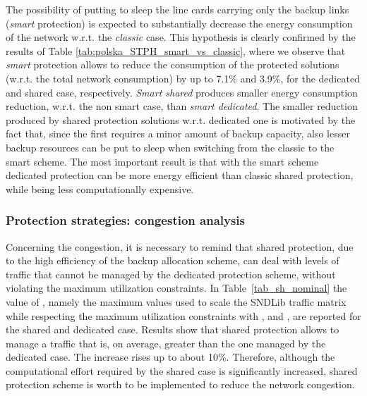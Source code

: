 \documentclass[final,5p,times,twocolumn]{elsarticle}
\begin{document}
The possibility of putting to sleep the line cards carrying only the backup links (\textit{smart} protection) is expected to substantially decrease the energy consumption of the network w.r.t. the \textit{classic} case. This hypothesis is clearly confirmed by the results of Table \ref{tab:polska_STPH_smart_vs_classic}, where we observe that \textit{smart} protection allows to reduce the consumption of the protected solutions (w.r.t. the total network consumption) by up to 7.1\% and 3.9\%, for the dedicated and shared case, respectively. \textit{Smart shared} produces smaller energy consumption reduction, w.r.t. the non smart case, than \textit{smart dedicated}.
The smaller reduction produced by shared protection solutions w.r.t. dedicated one is motivated by the fact that, since the first requires a minor amount of backup capacity, also lesser backup resources can be put to sleep when switching from the classic to the smart scheme. The most important result is that with the smart scheme dedicated protection can be more energy efficient than classic shared protection, while being less computationally expensive. 

\subsubsection{Protection strategies: congestion analysis}
Concerning the congestion, it is necessary to remind that shared protection, due to the high efficiency of the backup allocation scheme, can deal with levels of traffic that cannot be managed by the dedicated protection scheme, without violating  the maximum utilization constraints. In Table~\ref{tab_sh_nominal} the value of , namely the maximum values used to scale the SNDLib traffic matrix while respecting the maximum utilization constraints with ,  and , are reported for the shared and dedicated case. Results show that shared protection allows to manage a traffic that is, on average, greater than the one managed by the dedicated case. The increase rises up to about 10\%. Therefore,  although the computational effort required by the shared case is significantly increased, shared protection scheme is worth to be implemented to reduce the network congestion. 
\end{document}
